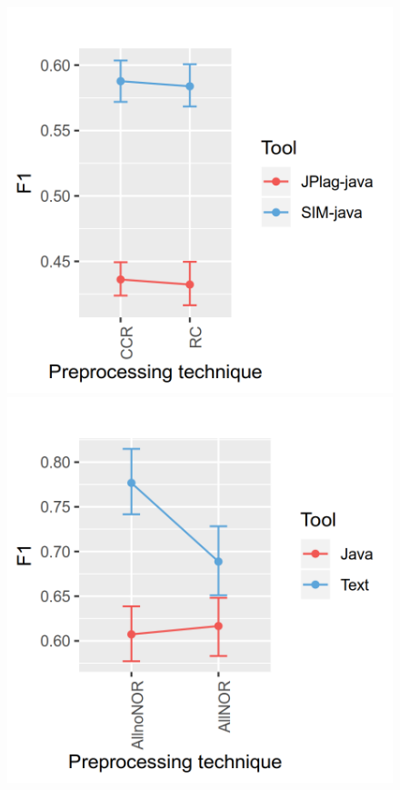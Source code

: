 \documentclass[a4paper, 12pt, oneside, openany, final, pdftex]{book}\usepackage[]{graphicx}\usepackage[]{color}
\makeatletter
\def\maxwidth{ %
  \ifdim\Gin@nat@width>\linewidth
    \linewidth
  \else
    \Gin@nat@width
  \fi
}
\makeatother
\begin{document}
\begin{appendices}
\begin{figure}[ht]
\label{fig:interaction- 14 for SOCO D1 }\endminipage\hfill {} 
\includegraphics[width=\maxwidth]{figure/Figure-SOCO-INTERACTION-15} 
\label{fig:interaction- 15 for SOCO D1 }\endminipage\hfill {} 
\includegraphics[width=\maxwidth]{figure/Figure-SOCO-INTERACTION-16} 

\end{figure}
\end{appendices}
\end{document}
